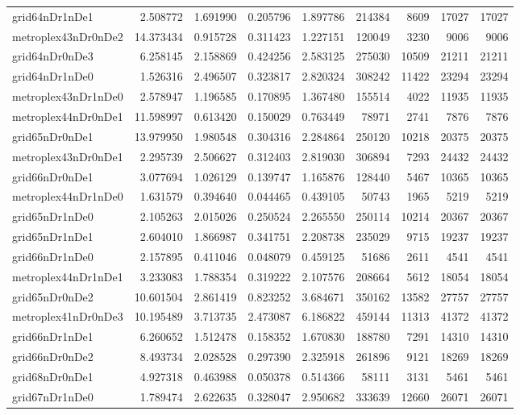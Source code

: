 \documentclass[../../../thesis.tex]{subfiles}
\begin{document}
\begin{longtable}{|l|r|r|r|r|r|r|r|r|}
grid64nDr1nDe1 & 2.508772 & 1.691990 & 0.205796 & 1.897786 & 214384 & 8609 & 17027 & 17027 \\
metroplex43nDr0nDe2 & 14.373434 & 0.915728 & 0.311423 & 1.227151 & 120049 & 3230 & 9006 & 9006 \\
grid64nDr0nDe3 & 6.258145 & 2.158869 & 0.424256 & 2.583125 & 275030 & 10509 & 21211 & 21211 \\
grid64nDr1nDe0 & 1.526316 & 2.496507 & 0.323817 & 2.820324 & 308242 & 11422 & 23294 & 23294 \\
metroplex43nDr1nDe0 & 2.578947 & 1.196585 & 0.170895 & 1.367480 & 155514 & 4022 & 11935 & 11935 \\
metroplex44nDr0nDe1 & 11.598997 & 0.613420 & 0.150029 & 0.763449 & 78971 & 2741 & 7876 & 7876 \\
grid65nDr0nDe1 & 13.979950 & 1.980548 & 0.304316 & 2.284864 & 250120 & 10218 & 20375 & 20375 \\
metroplex43nDr0nDe1 & 2.295739 & 2.506627 & 0.312403 & 2.819030 & 306894 & 7293 & 24432 & 24432 \\
grid66nDr0nDe1 & 3.077694 & 1.026129 & 0.139747 & 1.165876 & 128440 & 5467 & 10365 & 10365 \\
metroplex44nDr1nDe0 & 1.631579 & 0.394640 & 0.044465 & 0.439105 & 50743 & 1965 & 5219 & 5219 \\
grid65nDr1nDe0 & 2.105263 & 2.015026 & 0.250524 & 2.265550 & 250114 & 10214 & 20367 & 20367 \\
grid65nDr1nDe1 & 2.604010 & 1.866987 & 0.341751 & 2.208738 & 235029 & 9715 & 19237 & 19237 \\
grid66nDr1nDe0 & 2.157895 & 0.411046 & 0.048079 & 0.459125 & 51686 & 2611 & 4541 & 4541 \\
metroplex44nDr1nDe1 & 3.233083 & 1.788354 & 0.319222 & 2.107576 & 208664 & 5612 & 18054 & 18054 \\
grid65nDr0nDe2 & 10.601504 & 2.861419 & 0.823252 & 3.684671 & 350162 & 13582 & 27757 & 27757 \\
metroplex41nDr0nDe3 & 10.195489 & 3.713735 & 2.473087 & 6.186822 & 459144 & 11313 & 41372 & 41372 \\
grid66nDr1nDe1 & 6.260652 & 1.512478 & 0.158352 & 1.670830 & 188780 & 7291 & 14310 & 14310 \\
grid66nDr0nDe2 & 8.493734 & 2.028528 & 0.297390 & 2.325918 & 261896 & 9121 & 18269 & 18269 \\
grid68nDr0nDe1 & 4.927318 & 0.463988 & 0.050378 & 0.514366 & 58111 & 3131 & 5461 & 5461 \\
grid67nDr1nDe0 & 1.789474 & 2.622635 & 0.328047 & 2.950682 & 333639 & 12660 & 26071 & 26071 \\

\end{longtable}
\end{document}

